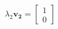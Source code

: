 \documentclass[preview]{standalone}
\begin{document}
\begin{align*}
\lambda_2 \mathbf{v_2} = \begin{bmatrix} 1 \\ 0 \end{bmatrix}
\end{align*}
\end{document}
